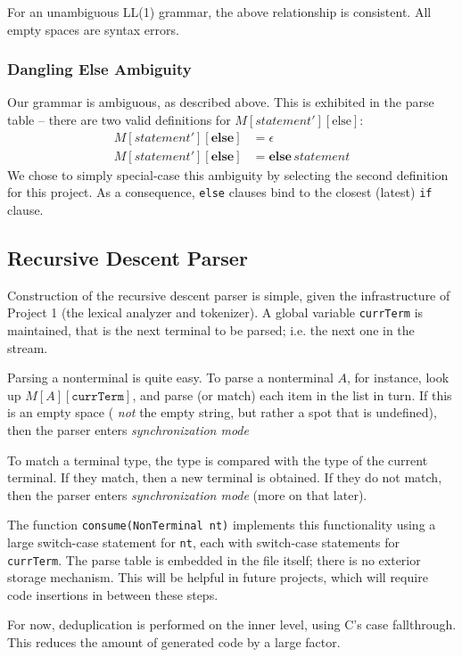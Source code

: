 \documentclass[titlepage]{article}
\newcommand{\ep}{\epsilon}
\begin{document}
		For an unambiguous LL(1) grammar, the above relationship is consistent. All empty spaces are syntax errors.

			\subsubsection{Dangling Else Ambiguity}
			Our grammar is ambiguous, as described above. This is exhibited in the parse table -- there are two valid definitions for $M[statement'][\textrm{else}]$:
			\begin{align*}
				M[statement'][\textbf{else}] &= \ep \\
				M[statement'][\textbf{else}] &= \textbf{else}\,statement
			\end{align*}
			We chose to simply special-case this ambiguity by selecting the second definition for this project. As a consequence, \texttt{else} clauses bind to the closest (latest) \texttt{if} clause.

		\subsection{Recursive Descent Parser}
		Construction of the recursive descent parser is simple, given the infrastructure of Project 1 (the lexical analyzer and tokenizer). A global variable \texttt{currTerm} is maintained, that is the next terminal to be parsed; i.e. the next one in the stream.

		Parsing a nonterminal is quite easy. To parse a nonterminal $A$, for instance, look up $M[A][\texttt{currTerm}]$, and parse (or match) each item in the list in turn. If this is an empty space ( \textit{not} the empty string, but rather a spot that is undefined), then the parser enters \textit{synchronization mode}

		To match a terminal type, the type is compared with the type of the current terminal. If they match, then a new terminal is obtained. If they do not match, then the parser enters \textit{synchronization mode} (more on that later).

		The function \texttt{consume(NonTerminal nt)} implements this functionality using a large switch-case statement for \texttt{nt}, each with switch-case statements for \texttt{currTerm}. The parse table is embedded in the file itself; there is no exterior storage mechanism. This will be helpful in future projects, which will require code insertions in between these steps.

		For now, deduplication is performed on the inner level, using C's case fallthrough. This reduces the amount of generated code by a large factor.
\end{document}
